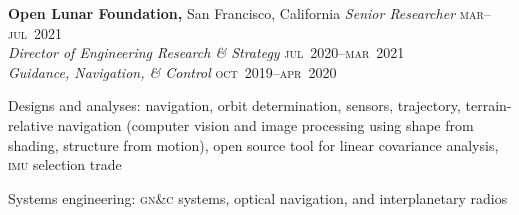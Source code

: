 \documentclass[12pt,letterpaper]{article}
\newenvironment{itemize*}%
{\begin{itemize}%
  \setlength{\itemsep}{0pt}}%
{\end{itemize}}
\newcommand{\rdate}[1]{{\hfill #1}}
\begin{document}
%

\medskip
\textbf{Open Lunar Foundation,} San Francisco, California \newline
\emph{Senior Researcher} \rdate{\textsc{mar}--\textsc{jul}~2021} \\
\emph{Director of Engineering Research \& Strategy} \rdate{\textsc{jul}~2020--\textsc{mar}~2021} \\
\emph{Guidance, Navigation, \& Control} \rdate{\textsc{oct}~2019--\textsc{apr}~2020}
\begin{itemize*}
  \item Designs and analyses: navigation, orbit determination, sensors, trajectory, terrain-relative navigation (computer vision and image processing using shape from shading, structure from motion), open source tool for linear covariance analysis, \textsc{imu} selection trade
  \item Systems engineering: \textsc{gn\&c} systems, optical navigation, and interplanetary radios
\end{itemize*}
\end{document}

